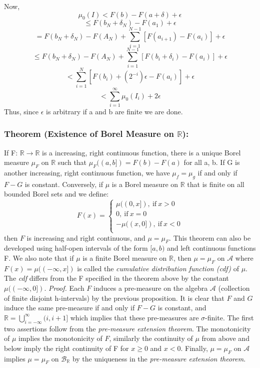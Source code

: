 \documentclass{article}
\begin{document}
Now,
\[
\mu_0(I) < F(b) - F(a+\delta) +\epsilon
\]
\[
\leq F(b_N+\delta_N)-F(a_1) +\epsilon
\]
\[
=F(b_N+\delta_N)-F(A_N) + \sum_{i=1}^{N-1}[F(a_{i+1})-F(a_{i})] +\epsilon
\]
\[
\leq F(b_N+\delta_N)-F(A_N) + \sum_{i=1}^{N-1}[F(b_i+\delta_i)-F(a_{i})] +\epsilon
\]
\[
<\sum_{i=1}^N[F(b_i)+(2^{-i})\epsilon-F(a_i)] +\epsilon
\]
\[
<\sum_{i=1}^{\infty}\mu_0(I_i)
+2\epsilon
\]
Thus, since $\epsilon$ is arbitrary if a and b are finite we are done.
\subsubsection{Theorem (Existence of Borel Measure on $\mathbb{R}$):}
If F: $\mathbb{R}\to\mathbb{R}$ is a increasing, right continuous function, there is a unique Borel measure $\mu_F$ on $\mathbb{R}$ such that $\mu_F((a,b])=F(b) -F(a)$ for all a, b. If G is another increasing, right continuous function, we have $\mu_f=\mu_g$ if and only if $F - G$ is constant. Conversely, if $\mu$ is a Borel measure on $\mathbb{R}$ that is finite on all bounded Borel sets and we define:  
\[
F(x) =\begin{cases}
\mu((0,x]),\  \text{if}\ x>0 \\
0, \ \text{if}\ x=0\\
-\mu((x,0]), \ \text{if}\ x<0\\
    
\end{cases}
\]
then $F$ is increasing and right continuous, and $\mu = \mu_F.$\newline \newline
This theorem can also be developed using half-open intervals of the form $[a,b)$ and left continuous functions F. We also note that if $\mu$ is a finite Borel measure on $\mathbb{R}$, then $\mu =\mu_F$ on $\mathcal{A}$ where $F(x) = \mu((-\infty,x])$ is called the \emph{cumulative distribution function (cdf)} of $\mu$. The \emph{cdf} differs from the F specified in the theorem above by the constant $\mu((-\infty,0])$.  \newline \newline
\textit{Proof.}\newline \newline
Each $F$ induces a pre-measure  on the algebra $\mathcal{A}$ (collection of finite disjoint h-intervals) by the previous proposition. It is clear that $F$ and $G$ induce the same pre-measure if and only if $F-G$ is constant, and $\mathbb{R}=\bigcup_{i=-\infty}^{\infty}(i,i+1]$ which implies that these pre-measures are $\sigma$-finite. The first two assertions follow from the \emph{pre-measure extension theorem}. The monotonicity of $\mu$ implies the monotonicity of $F$, similarly the continuity of $\mu$ from above and below imply the right continuity of F for $x\geq0$ and $x<0$. Finally, $\mu=\mu_F$ on $\mathcal{A}$ implies $\mu =\mu_F$ on $\mathcal{B}_{\mathbb{R}} $ by the uniqueness in the \emph{pre-measure extension theorem}.
\end{document}
